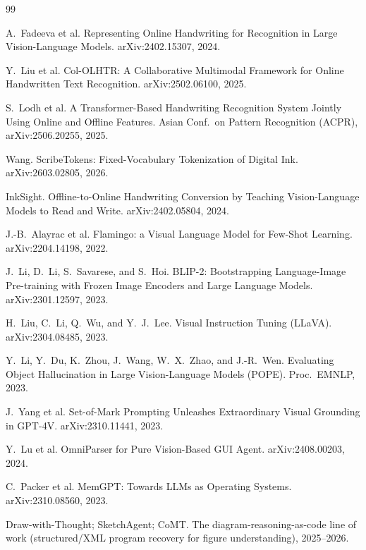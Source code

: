 \documentclass[11pt]{article}
\begin{document}
\begin{thebibliography}{99}
\footnotesize
\setlength{\itemsep}{0pt}
\setlength{\parskip}{0pt}

A.~Fadeeva et al.
\newblock Representing Online Handwriting for Recognition in Large Vision-Language Models.
\newblock arXiv:2402.15307, 2024.

Y.~Liu et al.
\newblock Col-OLHTR: A Collaborative Multimodal Framework for Online Handwritten Text Recognition.
\newblock arXiv:2502.06100, 2025.

S.~Lodh et al.
\newblock A Transformer-Based Handwriting Recognition System Jointly Using Online and Offline Features.
\newblock Asian Conf.\ on Pattern Recognition (ACPR), arXiv:2506.20255, 2025.

Wang.
\newblock ScribeTokens: Fixed-Vocabulary Tokenization of Digital Ink.
\newblock arXiv:2603.02805, 2026.

InkSight.
\newblock Offline-to-Online Handwriting Conversion by Teaching Vision-Language Models to Read and Write.
\newblock arXiv:2402.05804, 2024.

J.-B.~Alayrac et al.
\newblock Flamingo: a Visual Language Model for Few-Shot Learning.
\newblock arXiv:2204.14198, 2022.

J.~Li, D.~Li, S.~Savarese, and S.~Hoi.
\newblock BLIP-2: Bootstrapping Language-Image Pre-training with Frozen Image Encoders and Large Language Models.
\newblock arXiv:2301.12597, 2023.

H.~Liu, C.~Li, Q.~Wu, and Y.~J.~Lee.
\newblock Visual Instruction Tuning (LLaVA).
\newblock arXiv:2304.08485, 2023.

Y.~Li, Y.~Du, K.~Zhou, J.~Wang, W.~X.~Zhao, and J.-R.~Wen.
\newblock Evaluating Object Hallucination in Large Vision-Language Models (POPE).
\newblock Proc.\ EMNLP, 2023.

J.~Yang et al.
\newblock Set-of-Mark Prompting Unleashes Extraordinary Visual Grounding in GPT-4V.
\newblock arXiv:2310.11441, 2023.

Y.~Lu et al.
\newblock OmniParser for Pure Vision-Based GUI Agent.
\newblock arXiv:2408.00203, 2024.

C.~Packer et al.
\newblock MemGPT: Towards LLMs as Operating Systems.
\newblock arXiv:2310.08560, 2023.

Draw-with-Thought; SketchAgent; CoMT.
\newblock The diagram-reasoning-as-code line of work (structured/XML program recovery for figure understanding), 2025--2026.


\end{thebibliography}
\end{document}
